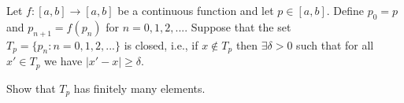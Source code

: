 Let $f : [a, b] \rightarrow [a, b]$ be a continuous function and let $p \in [a, b]$. Define $p_0 = p$ and $p_{n+1} = f(p_n)$ for $n = 0, 1, 2,...$. Suppose that the set $T_p = \{p_n : n = 0, 1, 2,...\}$ is closed, i.e., if $x \not\in T_p$ then $\exists \delta > 0$ such that for all $x' \in T_p$ we have $|x'-x|\ge\delta$.

Show that $T_p$ has finitely many elements.